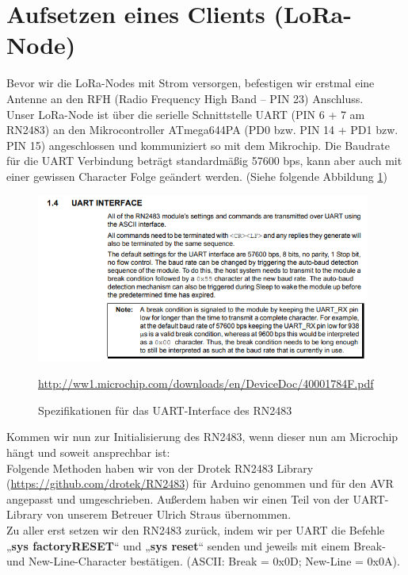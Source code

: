 \section{Aufsetzen eines Clients (LoRa-Node)} \label{mac-commands}
Bevor wir die LoRa-Nodes mit Strom versorgen, befestigen wir erstmal eine Antenne an den RFH (Radio Frequency High Band – PIN 23) Anschluss.\\
Unser LoRa-Node ist über die serielle Schnittstelle UART (PIN 6 + 7 am RN2483) an den Mikrocontroller ATmega644PA (PD0 bzw. PIN 14 + PD1 bzw. PIN 15) angeschlossen und kommuniziert so mit dem Mikrochip. Die Baudrate für die UART Verbindung beträgt standardmäßig 57600 bps, kann aber auch mit einer gewissen Character Folge geändert werden. (Siehe folgende Abbildung \ref{fig:UART})
\begin{figure}[H]
    \center
    \includegraphics[width=11cm]{Bilder/lora-8.png}\\
    \caption{Spezifikationen für das UART-Interface des RN2483}
    \begin{center} \quelle\url{http://ww1.microchip.com/downloads/en/DeviceDoc/40001784F.pdf} \end{center}
        \label{fig:UART}
\end{figure}
\noindent
Kommen wir nun zur Initialisierung des RN2483, wenn dieser nun am Microchip hängt und soweit ansprechbar ist:\\

\noindent
Folgende Methoden haben wir von der Drotek RN2483 Library (\url{https://github.com/drotek/RN2483}) für Arduino genommen und für den AVR angepasst und umgeschrieben. Außerdem haben wir einen Teil von der UART-Library von unserem Betreuer Ulrich Straus übernommen.\\

\noindent
Zu aller erst setzen wir den RN2483 zurück, indem wir per UART die Befehle „\textbf{sys factoryRESET}“ und „\textbf{sys reset}“ senden und jeweils mit einem Break- und New-Line-Character bestätigen. (ASCII: Break = 0x0D; New-Line = 0x0A).\\

